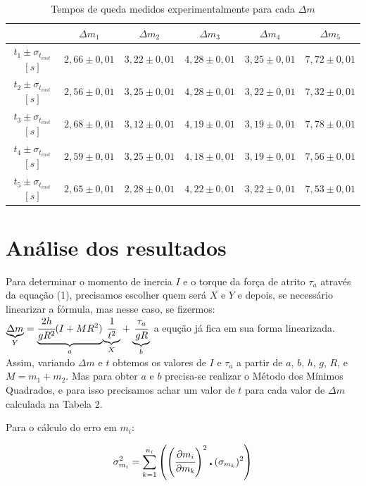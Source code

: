 \documentclass[a4paper]{article}
\providecommand{\tabularnewline}{\\} %
\begin{document}
\begin{table}[!ht]
	\begin{centering}
	\caption{Tempos de queda medidos experimentalmente para cada $\Delta m$}
	\par\end{centering}
	\centering{}%
	\begin{tabular}{|c|c|c|c|c|c|}
	\cline{2-6} 
	\multicolumn{1}{c|}{} & $\Delta m_{1}$ & $\Delta m_{2}$ & $\Delta m_{3}$ & $\Delta m_{4}$ & $\Delta m_{5}$\tabularnewline	\hline 
	$t_{1}\pm\sigma_{t_{inst}}$$[s]$ & $2,66\pm0,01$ & $3,22\pm0,01$ & $4,28\pm0,01$ & $3,25\pm0,01$ & $7,72\pm0,01$\tabularnewline		\hline		$t_{2}\pm\sigma_{t_{inst}}$$[s]$ & $2,56\pm0,01$ & $3,25\pm0,01$ & $4,28\pm0,01$ & $3,22\pm0,01$ & $7,32\pm0,01$\tabularnewline		\hline 
	$t_{3}\pm\sigma_{t_{inst}}$$[s]$ & $2,68\pm0,01$ & $3,12\pm0,01$ & $4,19\pm0,01$ & $3,19\pm0,01$ & $7,78\pm0,01$\tabularnewline		\hline 
	$t_{4}\pm\sigma_{t_{inst}}$$[s]$ & $2,59\pm0,01$ & $3,25\pm0,01$ & $4,18\pm0,01$ & $3,19\pm0,01$ & $7,56\pm0,01$\tabularnewline		\hline 
	$t_{5}\pm\sigma_{t_{inst}}$$[s]$ & $2,65\pm0,01$ & $2,28\pm0,01$ & $4,22\pm0,01$ & $3,22\pm0,01$ & $7,53\pm0,01$\tabularnewline		\hline 
	\end{tabular}
\end{table}
	

\section{Análise dos resultados}

Para determinar o momento de inercia $I$ e o torque da força de atrito $\tau_{a}$ através da equação (1), precisamos escolher quem será $X$ e $Y$ e depois, se necessário linearizar a fórmula, mas nesse caso, se fizermos: $\underset{Y}{\underbrace{\Delta m}}=\underset{a}{\underbrace{\cfrac{2h}{gR^{2}}(I+MR^{2})}}\underset{X}{\underbrace{\ensuremath{\cfrac{1}{t^{2}}}}}+\underset{b}{\underbrace{\cfrac{\tau_{a}}{gR}}}$ a equção já fica em sua forma linearizada. Assim, variando $\Delta m$ e $t$ obtemos os valores de $I$ e $\tau_{a}$ a partir de $a$, $b$, $h$, $g$, $R$, e $M=m_{1}+m_{2}$.
Mas para obter $a$ e $b$ precisa-se realizar o Método dos Mínimos Quadrados, e para isso precisamos achar um valor de $t$ para cada valor de $\Delta m$ calculada na Tabela 2.


Para o cálculo do erro em $m_{i}$:

\begin{align}
	\sigma_{m_{i}}^{2}={\displaystyle \sum_{k=1}^{n_{i}}\left(\left(\cfrac{\partial m_{i}}{\partial m_{k}}\right)^{2}\centerdot(\sigma_{m_{k}})^{2}\right)}
\end{align}
\end{document}
